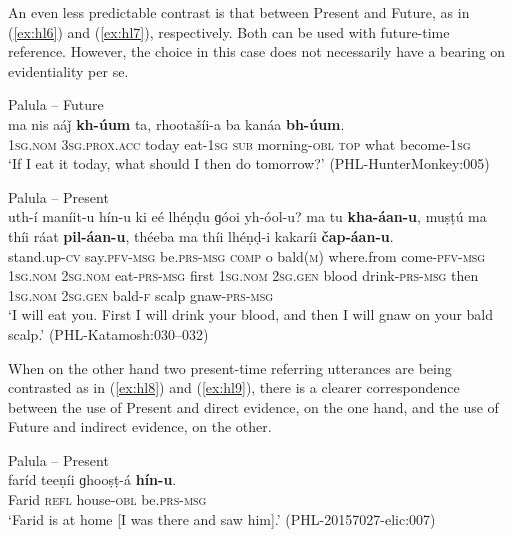 \documentclass[output=paper]{langsci/langscibook}
\begin{document}
An even less predictable contrast is that between Present and Future, as in ‎(\ref{ex:hl6}) and ‎(\ref{ex:hl7}), respectively. Both can be used with future-time reference. However, the choice in this case does not necessarily have a bearing on evidentiality per se. 

\begin{exe}
	\ex Palula -- Future \label{ex:hl6}\\
	\gll ma nis aáǰ \textbf{kh-úum} ta, rhootašíi-a ba kanáa \textbf{bh-úum}.\\
	1\textsc{sg}.\textsc{nom} 3\textsc{sg}.\textsc{prox}.\textsc{acc} today eat-1\textsc{sg} \textsc{sub} morning-\textsc{obl} \textsc{top} what become-1\textsc{sg}\\
	\trans ‘If I eat it today, what should I then do tomorrow?’ (PHL-HunterMonkey:005)
\end{exe}

\begin{exe}
	\ex Palula -- Present \label{ex:hl7}\\
	\gll uth-í maníit-u hín-u ki eé lhéṇḍu ɡóoi yh-óol-u? ma tu \textbf{kha-áan-u}, muṣṭú ma thíi ráat \textbf{pil-áan-u}, théeba ma thíi lhéṇḍ-i kakaríi \textbf{čap-áan-u}.\\
	stand.up-\textsc{cv} say.\textsc{pfv}-\textsc{msg} be.\textsc{prs}-\textsc{msg} \textsc{comp} o bald(\textsc{m}) where.from come-\textsc{pfv}-\textsc{msg} 1\textsc{sg}.\textsc{nom} 2\textsc{sg}.\textsc{nom} eat-\textsc{prs}-\textsc{msg} first 1\textsc{sg}.\textsc{nom} 2\textsc{sg}.\textsc{gen} blood drink-\textsc{prs}-\textsc{msg} then 1\textsc{sg}.\textsc{nom} 2\textsc{sg}.\textsc{gen} bald-\textsc{f} scalp gnaw-\textsc{prs}-\textsc{msg}\\
	\trans ‘I will eat you. First I will drink your blood, and then I will gnaw on your bald scalp.’ (PHL-Katamosh:030–032)
\end{exe}

When on the other hand two present-time referring utterances are being contrasted as in ‎(\ref{ex:hl8}) and ‎(\ref{ex:hl9}), there is a clearer correspondence between the use of Present and direct evidence, on the one hand, and the use of Future and indirect evidence, on the other.

\begin{exe}
	\ex Palula -- Present \label{ex:hl8}\\
	\gll faríd teeṇíi ɡhooṣṭ-á \textbf{hín-u}.\\
	Farid \textsc{refl} house-\textsc{obl} be.\textsc{prs}-\textsc{msg} \\
	\trans ‘Farid is at home [I was there and saw him].’ (PHL-20157027-elic:007)
\end{exe}
\end{document}

